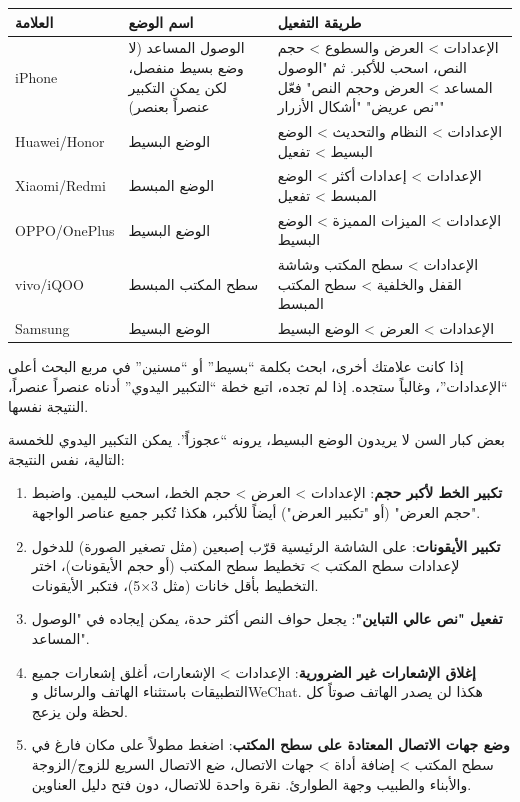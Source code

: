
\begin{center}
\begin{tabularx}{\linewidth}{|X|X|X|}
\hline
\textbf{العلامة} & \textbf{اسم الوضع} & \textbf{طريقة التفعيل} \tabularnewline
\hline
iPhone & الوصول المساعد (لا وضع بسيط منفصل، لكن يمكن التكبير عنصراً بعنصر) & الإعدادات > العرض والسطوع > حجم النص، اسحب للأكبر. ثم "الوصول المساعد > العرض وحجم النص" فعّل "نص عريض" "أشكال الأزرار" \tabularnewline
Huawei/Honor & الوضع البسيط & الإعدادات > النظام والتحديث > الوضع البسيط > تفعيل \tabularnewline
Xiaomi/Redmi & الوضع المبسط & الإعدادات > إعدادات أكثر > الوضع المبسط > تفعيل \tabularnewline
OPPO/OnePlus & الوضع البسيط & الإعدادات > الميزات المميزة > الوضع البسيط \tabularnewline
vivo/iQOO & سطح المكتب المبسط & الإعدادات > سطح المكتب وشاشة القفل والخلفية > سطح المكتب المبسط \tabularnewline
Samsung & الوضع البسيط & الإعدادات > العرض > الوضع البسيط \tabularnewline
\hline
\end{tabularx}
\end{center}

إذا كانت علامتك أخرى، ابحث بكلمة “بسيط” أو “مسنين” في مربع البحث أعلى “الإعدادات”، وغالباً ستجده. إذا لم تجده، اتبع خطة “التكبير اليدوي” أدناه عنصراً عنصراً، النتيجة نفسها.


بعض كبار السن لا يريدون الوضع البسيط، يرونه “عجوزاً”. يمكن التكبير اليدوي للخمسة التالية، نفس النتيجة:

\begin{enumerate}
  \item \textbf{تكبير الخط لأكبر حجم}: الإعدادات > العرض > حجم الخط، اسحب لليمين. واضبط "حجم العرض" (أو "تكبير العرض") أيضاً للأكبر، هكذا تُكبر جميع عناصر الواجهة.
  \item \textbf{تكبير الأيقونات}: على الشاشة الرئيسية قرّب إصبعين (مثل تصغير الصورة) للدخول لإعدادات سطح المكتب > تخطيط سطح المكتب (أو حجم الأيقونات)، اختر التخطيط بأقل خانات (مثل 3×5)، فتكبر الأيقونات.
  \item \textbf{تفعيل "نص عالي التباين"}: يجعل حواف النص أكثر حدة، يمكن إيجاده في "الوصول المساعد".
  \item \textbf{إغلاق الإشعارات غير الضرورية}: الإعدادات > الإشعارات، أغلق إشعارات جميع التطبيقات باستثناء الهاتف والرسائل وWeChat. هكذا لن يصدر الهاتف صوتاً كل لحظة ولن يزعج.
  \item \textbf{وضع جهات الاتصال المعتادة على سطح المكتب}: اضغط مطولاً على مكان فارغ في سطح المكتب > إضافة أداة > جهات الاتصال، ضع الاتصال السريع للزوج/الزوجة والأبناء والطبيب وجهة الطوارئ. نقرة واحدة للاتصال، دون فتح دليل العناوين.
\end{enumerate}

